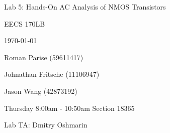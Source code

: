 \centering
\vspace{2.5cm}
{\huge Lab 5: Hands-On AC Analysis of NMOS Transistors \par}
{\Large EECS 170LB \par}
{\Large \today \par}
\vspace{1cm}
{\large Roman Parise (59611417) \par}
{\large Johnathan Fritsche (11106947) \par}
{\large Jason Wang (42873192) \par}
{\large \par}
\vspace{1cm}
{\large Thursday 8:00am - 10:50am Section 18365 \par}
{\large Lab TA: Dmitry Oshmarin \par}
\vspace{1cm}
